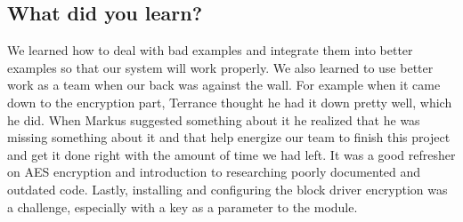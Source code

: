 \documentclass[draftclsnofoot,onecolumn,10pt,compsoc]{IEEEtran}
\begin{document}
\subsection{What did you learn?}
We learned how to deal with bad examples and integrate them into better examples so that our system will work properly.  We also learned to use better work as a team when our back was against the wall. For example when it came down to the encryption part, Terrance thought he had it down pretty well, which he did. When Markus suggested something about it he realized that he was missing something about it and that help energize our team to finish this project and get it done right with the amount of time we had left. It was a good refresher on AES encryption and introduction to researching poorly documented and outdated code. Lastly, installing and configuring the block driver encryption was a challenge, especially with a key as a parameter to the module. 
\end{document}
